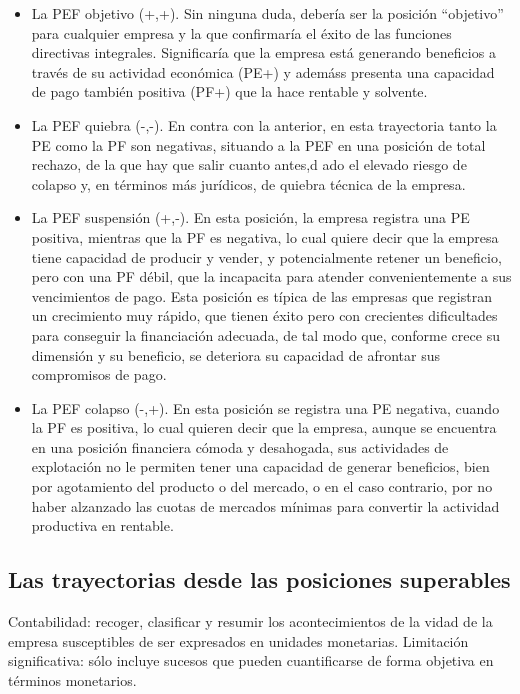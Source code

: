 \begin{itemize}
    \item La PEF objetivo (+,+). Sin ninguna duda, debería ser la posición ``objetivo'' para cualquier empresa y la que confirmaría el éxito de las funciones directivas integrales. Significaría que la empresa está generando beneficios a través de su actividad económica (PE+) y ademáss presenta una capacidad de pago también positiva (PF+) que la hace rentable y solvente.
    \item La PEF quiebra (-,-). En contra con la anterior, en esta trayectoria tanto la PE como la PF son negativas, situando a la PEF en una posición de total rechazo, de la que hay que salir cuanto antes,d ado el elevado riesgo de colapso y, en términos más jurídicos, de quiebra técnica de la empresa.
    \item La PEF suspensión (+,-). En esta posición, la empresa registra una PE positiva, mientras que la PF es negativa, lo cual quiere decir que la empresa tiene capacidad de producir y vender, y potencialmente retener un beneficio, pero con una PF débil, que la incapacita para atender convenientemente a sus vencimientos de pago. Esta posición es típica de las empresas que registran un crecimiento muy rápido, que tienen éxito pero con crecientes dificultades para conseguir la financiación adecuada, de tal modo que, conforme crece su dimensión y su beneficio, se deteriora su capacidad de afrontar sus compromisos de pago.
    \item La PEF colapso (-,+). En esta posición se registra una PE negativa, cuando la PF es positiva, lo cual quieren decir que la empresa, aunque se encuentra en una posición financiera cómoda y desahogada, sus actividades de explotación no le permiten tener una capacidad de generar beneficios, bien por agotamiento del producto o del mercado, o en el caso contrario, por no haber alzanzado las cuotas de mercados mínimas para convertir la actividad productiva en rentable.
\end{itemize}

\subsection{Las trayectorias desde las posiciones superables}

Contabilidad: recoger, clasificar y resumir los acontecimientos de la vidad de la empresa susceptibles de ser expresados en unidades monetarias.
Limitación significativa: sólo incluye sucesos que pueden cuantificarse de forma objetiva en términos monetarios.

